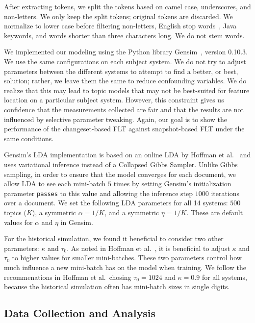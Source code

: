 After extracting tokens, we split the tokens based on camel case,
underscores, and non-letters.
We only keep the split tokens; original tokens are discarded.
We normalize to lower case before filtering non-letters, English stop words~\cite{StopWords}, Java keywords, and words shorter than three characters long.
We do not stem words.

We implemented our modeling using the Python library Gensim~\cite{Gensim},
version 0.10.3. We use the same configurations on each subject system.  We do
not try to adjust parameters between the different systems to attempt to find
a better, or best, solution; rather, we leave them the same to reduce
confounding variables.  We do realize that this may lead to topic models that
may not be best-suited for feature location on a particular subject system.
However, this constraint gives us confidence that the measurements collected are
fair and that the results are not influenced by selective parameter tweaking.
Again, our goal is to show the performance of the changeset-based FLT against
snapshot-based FLT under the same conditions.

Gensim's LDA implementation is based on an online LDA by Hoffman et
al.~\cite{Hoffman-etal:2010} and uses variational inference instead of
a Collapsed Gibbs Sampler.  Unlike Gibbs sampling, in order to ensure that the
model converges for each document, we allow LDA to see each mini-batch $5$ times
by setting Gensim's initialization parameter \texttt{passes} to this value and
allowing the inference step $1000$ iterations over a document.  We set the
following LDA parameters for all 14 systems: $500$ topics ($K$), a symmetric
$\alpha=1/K$, and a symmetric $\eta=1/K$.  These are default values for
$\alpha$ and $\eta$ in Gensim.

For the historical simulation, we found it beneficial to consider two other
parameters: $\kappa$ and $\tau_0$.  As noted in Hoffman et
al.~\cite{Hoffman-etal:2010}, it is beneficial to adjust $\kappa$ and $\tau_0$
to higher values for smaller mini-batches.  These two parameters control how
much influence a new mini-batch has on the model when training.  We follow the
recommenations in Hoffman et al.\, chosing $\tau_0=1024$ and $\kappa=0.9$ for
all systems, because the historical simulation often has mini-batch sizes in
single digits.




\subsection{Data Collection and Analysis}
\label{sec:data}

